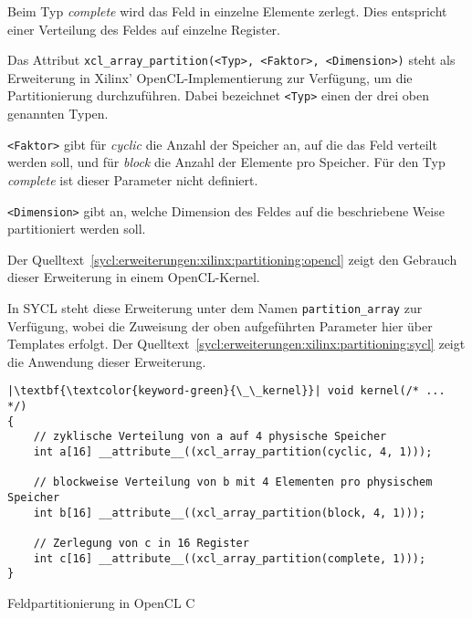 Beim Typ \textit{complete} wird das Feld in einzelne Elemente zerlegt. Dies
entspricht einer Verteilung des Feldes auf einzelne Register.
\cite[vgl.][17]{sdxpragma2019}

Das Attribut \texttt{xcl\_array\_partition(<Typ>, <Faktor>, <Dimension>)} steht
als Erweiterung in Xilinx' OpenCL-Implementierung zur Verfügung, um die
Partitionierung durchzuführen. Dabei bezeichnet \texttt{<Typ>} einen der drei
oben genannten Typen. \cite[vgl.][17]{sdxpragma2019}

\texttt{<Faktor>} gibt für \textit{cyclic} die Anzahl der Speicher an, auf die
das Feld verteilt werden soll, und für \textit{block} die Anzahl der Elemente
pro Speicher. Für den Typ \textit{complete} ist dieser Parameter nicht
definiert. \cite[vgl.][17]{sdxpragma2019}

\texttt{<Dimension>} gibt an, welche Dimension des Feldes auf die beschriebene
Weise partitioniert werden soll. \cite[vgl.][17]{sdxpragma2019}

Der Quelltext~\ref{sycl:erweiterungen:xilinx:partitioning:opencl} zeigt den
Gebrauch dieser Erweiterung in einem OpenCL-Kernel.

In SYCL steht diese Erweiterung unter dem Namen \texttt{partition\_array} zur
Verfügung, wobei die Zuweisung der oben aufgeführten Parameter hier über
Templates erfolgt. Der
Quelltext~\ref{sycl:erweiterungen:xilinx:partitioning:sycl} zeigt die Anwendung
dieser Erweiterung.

\begin{code}
    \begin{verbatim}
|\textbf{\textcolor{keyword-green}{\_\_kernel}}| void kernel(/* ... */)
{
    // zyklische Verteilung von a auf 4 physische Speicher
    int a[16] __attribute__((xcl_array_partition(cyclic, 4, 1)));

    // blockweise Verteilung von b mit 4 Elementen pro physischem Speicher
    int b[16] __attribute__((xcl_array_partition(block, 4, 1)));

    // Zerlegung von c in 16 Register
    int c[16] __attribute__((xcl_array_partition(complete, 1)));
}
    \end{verbatim}
    \caption{Feldpartitionierung in OpenCL C}
    \label{sycl:erweiterungen:xilinx:partitioning:opencl}
\end{code}

